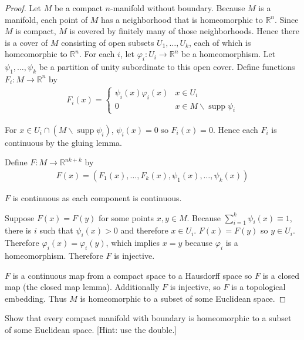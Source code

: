 \begin{proof}
	Let $M$ be a compact $n$-manifold without boundary. Because $M$ is a manifold, each point of $M$ has a neighborhood that is homeomorphic to $\mathbb{R}^{n}$. Since $M$ is compact, $M$ is covered by finitely many of those neighborhoods. Hence there is a cover of $M$ consisting of open subsets $U_{1}, \ldots, U_{k}$, each of which is homeomorphic to $\mathbb{R}^{n}$. For each $i$, let $\varphi_{i}: U_{i} \to \mathbb{R}^{n}$ be a homeomorphism. Let $\psi_{1}, \ldots, \psi_{k}$ be a partition of unity subordinate to this open cover. Define functions $F_{i}: M \to \mathbb{R}^{n}$ by
	\begin{align*}
		F_{i}(x) = \begin{cases}
			           \psi_{i}(x)\varphi_{i}(x) & x\in U_{i}                                        \\
			           0                         & x\in M \smallsetminus \operatorname{supp}\psi_{i}
		           \end{cases}
	\end{align*}

	For $x\in U_{i} \cap (M \smallsetminus \operatorname{supp}\psi_{i})$, $\psi_{i}(x) = 0$ so $F_{i}(x) = 0$. Hence each $F_{i}$ is continuous by the gluing lemma.

	Define $F: M \to \mathbb{R}^{nk + k}$ by
	\begin{align*}
		F(x) = (F_{1}(x), \ldots, F_{k}(x), \psi_{1}(x), \ldots, \psi_{k}(x))
	\end{align*}

	$F$ is continuous as each component is continuous.

	Suppose $F(x) = F(y)$ for some points $x, y\in M$. Because $\sum^{k}_{i=1}\psi_{i}(x) \equiv 1$, there is $i$ such that $\psi_{i}(x) > 0$ and therefore $x\in U_{i}$. $F(x) = F(y)$ so $y \in U_{i}$. Therefore $\varphi_{i}(x) = \varphi_{i}(y)$, which implies $x = y$ because $\varphi_{i}$ is a homeomorphism. Therefore $F$ is injective.

	$F$ is a continuous map from a compact space to a Hausdorff space so $F$ is a closed map (the closed map lemma). Additionally $F$ is injective, so $F$ is a topological embedding. Thus $M$ is homeomorphic to a subset of some Euclidean space.
\end{proof}

\begin{exercise}{4.87}
	Show that every compact manifold with boundary is homeomorphic to a subset of some Euclidean space. [Hint: use the double.]
\end{exercise}


